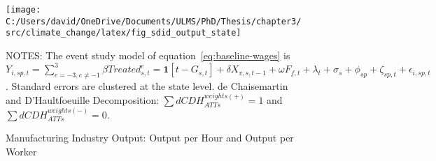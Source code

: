 \begin{figure}[H]
    \centering
    \texttt{[image: C:/Users/david/OneDrive/Documents/ULMS/PhD/Thesis/chapter3/src/climate\_change/latex/fig\_sdid\_output\_state]}
    \caption{Manufacturing Industry Output: Output per Hour and Output per Worker}
    \label{fig:baseline-industry-output}
    \begin{minipage}{\columnwidth}
        \vspace{0.05in}
        \tiny NOTES: The event study model of equation~\ref{eq:baseline-wages} is $Y_{i,sp,t} = \sum_{{e = -3},{e \neq -1}}^{3} \beta Treated_{s,t}^e = \textbf{1}[t - G_{s,t}] + \delta X_{v,s,t-1} + \omega F_{f,t} + \lambda_{t} + \sigma_{s} + \phi_{sp} + \zeta_{sp,t} + \epsilon_{i,sp,t}$. Standard errors are clustered at the state level. de Chaisemartin and D'Haultfoeuille Decomposition: $\sum dCDH_{ATTs}^{weights(+)} = 1$ and $\sum dCDH_{ATTs}^{weights(-)} = 0$.
    \end{minipage}
\end{figure}